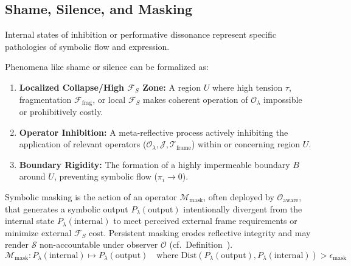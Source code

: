 \subsection{Shame, Silence, and Masking}
\label{subsec:bk9_shame_silence_and_masking}
Internal states of inhibition or performative dissonance represent specific pathologies of symbolic flow and expression.
\begin{definition}
\label{definition:bk9_symbolic_shame}
Phenomena like shame or silence can be formalized as:
\begin{enumerate}
    \item \textbf{Localized Collapse/High $\mathcal{F}_S$ Zone:} A region $U$ where high tension $\tau$, fragmentation $\mathcal{F}_{\text{frag}}$, or local $\mathcal{F}_S$ makes coherent operation of $\mathcal{O}_\lambda$ impossible or prohibitively costly.
    \item \textbf{Operator Inhibition:} A meta-reflective process actively inhibiting the application of relevant operators ($\mathcal{O}_\lambda, \mathcal{J}, \mathcal{T}_{\text{frame}}$) within or concerning region $U$.
    \item \textbf{Boundary Rigidity:} The formation of a highly impermeable boundary $B$ around $U$, preventing symbolic flow ($\pi_i \to 0$).
\end{enumerate}
\end{definition}
\begin{definition}
\label{definition:bk9__symbolic_masking_operator}
Symbolic masking is the action of an operator $\mathcal{M}_{\text{mask}}$, often deployed by $\mathcal{O}_{\text{aware}}$, that generates a symbolic output $P_\lambda(\text{output})$ intentionally divergent from the internal state $P_\lambda(\text{internal})$ to meet perceived external frame requirements or minimize external $\mathcal{F}_S$ cost. Persistent masking erodes reflective integrity and may render $\mathcal{S}$ non-accountable under observer $\mathcal{O}$ (cf.~Definition~).
\[
\mathcal{M}_{\text{mask}}: P_\lambda(\text{internal}) \mapsto P_\lambda(\text{output}) \quad \text{where } \text{Dist}(P_\lambda(\text{output}), P_\lambda(\text{internal})) > \epsilon_{\text{mask}}
\]
\end{definition}
